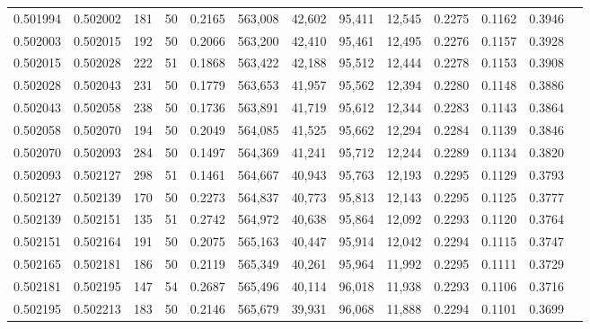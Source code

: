 \begin{tabular}{rrrrrrrrrrrrr}
0.501994 & 0.502002 & 181 &  50 &                                     0.2165 & 563,008 &  42,602 &  95,411 &  12,545 & 0.2275 & 0.1162 & 0.3946 \\
0.502003 & 0.502015 & 192 &  50 &                                     0.2066 & 563,200 &  42,410 &  95,461 &  12,495 & 0.2276 & 0.1157 & 0.3928 \\
0.502015 & 0.502028 & 222 &  51 &                                     0.1868 & 563,422 &  42,188 &  95,512 &  12,444 & 0.2278 & 0.1153 & 0.3908 \\
0.502028 & 0.502043 & 231 &  50 &                                     0.1779 & 563,653 &  41,957 &  95,562 &  12,394 & 0.2280 & 0.1148 & 0.3886 \\
0.502043 & 0.502058 & 238 &  50 &                                     0.1736 & 563,891 &  41,719 &  95,612 &  12,344 & 0.2283 & 0.1143 & 0.3864 \\
0.502058 & 0.502070 & 194 &  50 &                                     0.2049 & 564,085 &  41,525 &  95,662 &  12,294 & 0.2284 & 0.1139 & 0.3846 \\
0.502070 & 0.502093 & 284 &  50 &                                     0.1497 & 564,369 &  41,241 &  95,712 &  12,244 & 0.2289 & 0.1134 & 0.3820 \\
0.502093 & 0.502127 & 298 &  51 &                                     0.1461 & 564,667 &  40,943 &  95,763 &  12,193 & 0.2295 & 0.1129 & 0.3793 \\
0.502127 & 0.502139 & 170 &  50 &                                     0.2273 & 564,837 &  40,773 &  95,813 &  12,143 & 0.2295 & 0.1125 & 0.3777 \\
0.502139 & 0.502151 & 135 &  51 &                                     0.2742 & 564,972 &  40,638 &  95,864 &  12,092 & 0.2293 & 0.1120 & 0.3764 \\
0.502151 & 0.502164 & 191 &  50 &                                     0.2075 & 565,163 &  40,447 &  95,914 &  12,042 & 0.2294 & 0.1115 & 0.3747 \\
0.502165 & 0.502181 & 186 &  50 &                                     0.2119 & 565,349 &  40,261 &  95,964 &  11,992 & 0.2295 & 0.1111 & 0.3729 \\
0.502181 & 0.502195 & 147 &  54 &                                     0.2687 & 565,496 &  40,114 &  96,018 &  11,938 & 0.2293 & 0.1106 & 0.3716 \\
0.502195 & 0.502213 & 183 &  50 &                                     0.2146 & 565,679 &  39,931 &  96,068 &  11,888 & 0.2294 & 0.1101 & 0.3699 \\

\end{tabular}
